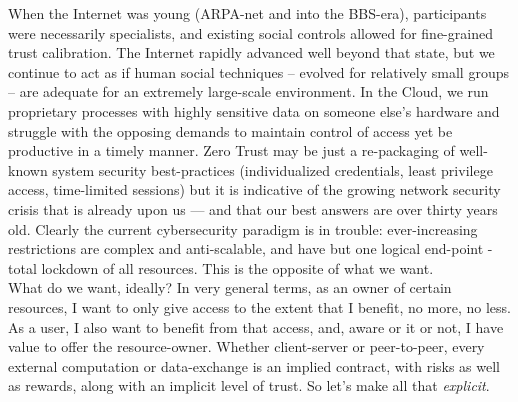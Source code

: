 When the Internet was young (ARPA-net and into the BBS-era), participants were necessarily specialists, and existing social controls allowed for fine-grained trust calibration.
The Internet rapidly advanced well beyond that state, but we continue to act as if human social techniques -- evolved for relatively small groups -- are adequate for an extremely large-scale environment.
In the Cloud, we run proprietary processes with highly sensitive data on someone else's hardware and struggle with the opposing demands to maintain control of access yet be productive in a timely manner.
Zero Trust may be just a re-packaging of well-known system security best-practices (individualized credentials, least privilege access, time-limited sessions) but it is indicative of the growing network security crisis that is already upon us --- and that our best answers are over thirty years old.
Clearly the current cybersecurity paradigm is in trouble: ever-increasing restrictions are complex and anti-scalable, and have but one logical end-point - total lockdown of all resources.
This is the opposite of what we want.
\\[10pt]
What do we want, ideally?
In very general terms, as an owner of certain resources, I want to only give access to the extent that I benefit, no more, no less.
As a user, I also want to benefit from that access, and, aware or it or not, I have value to offer the resource-owner.
Whether client-server or peer-to-peer, every external computation or data-exchange is an implied contract, with risks as well as rewards, along with an implicit level of trust.
So let's make all that \emph{explicit}.

